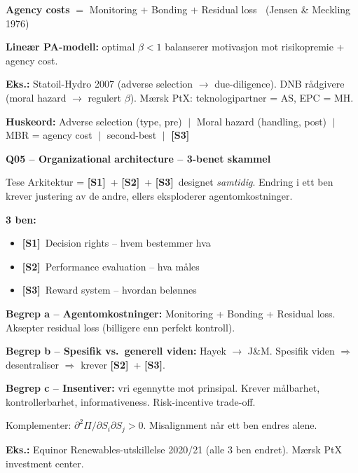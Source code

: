 \documentclass[10pt, a4paper]{article}
\newcommand{\SOne}{\textcolor{s1color}{\textbf{[S1]}}}
\newcommand{\STwo}{\textcolor{s2color}{\textbf{[S2]}}}
\newcommand{\SThree}{\textcolor{s3color}{\textbf{[S3]}}}
\newcommand{\qhead}[2]{%
  \noindent
  \begin{tcolorbox}[colback=boxborder, colframe=boxborder, arc=2pt, left=6pt, right=6pt, top=2pt, bottom=2pt]
    \color{white}\textbf{\large Q#1 -- #2}
  \end{tcolorbox}
}
\newcommand{\huskeord}[1]{%
  \vspace{2pt}
  \begin{tcolorbox}[colback=yellow!15, colframe=orange!70!black, boxrule=0.4pt, arc=2pt, left=4pt, right=4pt, top=2pt, bottom=2pt]
    \footnotesize\textbf{Huskeord:} #1
  \end{tcolorbox}
}
\begin{document}
\begin{formulabox}
\textbf{Agency costs} $=$ Monitoring $+$ Bonding $+$ Residual loss $\;\;$(Jensen \& Meckling 1976)
\end{formulabox}

\textbf{Lineær PA-modell:} optimal $\beta < 1$ balanserer motivasjon mot risikopremie + agency cost.

\textbf{Eks.:} Statoil-Hydro 2007 (adverse selection $\to$ due-diligence). DNB rådgivere (moral hazard $\to$ regulert $\beta$). Mærsk PtX: teknologipartner = AS, EPC = MH.

\huskeord{Adverse selection (type, pre) $\;\big|\;$ Moral hazard (handling, post) $\;\big|\;$ MBR = agency cost $\;\big|\;$ second-best $\;\big|\;$ \SThree}

\vfill\newpage

\qhead{05}{Organizational architecture -- 3-benet skammel}

\begin{keybox}{Tese}
Arkitektur = \SOne\ + \STwo\ + \SThree\ designet \emph{samtidig}. Endring i ett ben krever justering av de andre, ellers eksploderer agentomkostninger.
\end{keybox}

\textbf{3 ben:}
\begin{itemize}
  \item \SOne\ Decision rights -- hvem bestemmer hva
  \item \STwo\ Performance evaluation -- hva måles
  \item \SThree\ Reward system -- hvordan belønnes
\end{itemize}

\textbf{Begrep a -- Agentomkostninger:} Monitoring + Bonding + Residual loss. Aksepter residual loss (billigere enn perfekt kontroll).

\textbf{Begrep b -- Spesifik vs.\ generell viden:} Hayek $\to$ J\&M. Spesifik viden $\Rightarrow$ desentraliser $\Rightarrow$ krever \STwo\ + \SThree.

\textbf{Begrep c -- Insentiver:} vri egennytte mot prinsipal. Krever målbarhet, kontrollerbarhet, informativeness. Risk-incentive trade-off.

\begin{formulabox}
Komplementer: $\partial^{2} \Pi / \partial S_i \partial S_j > 0$. Misalignment når ett ben endres alene.
\end{formulabox}

\textbf{Eks.:} Equinor Renewables-utskillelse 2020/21 (alle 3 ben endret). Mærsk PtX investment center.
\end{document}

